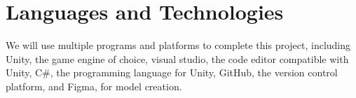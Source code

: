 \documentclass[12pt,oneside,openright,a4paper]{cpe-english-project}
\begin{document}
%


%
%
%

\section{Languages and Technologies}
We will use multiple programs and platforms to complete this project, including Unity, the game engine of choice, visual studio, the code editor compatible with Unity, C\#, the programming language for Unity, GitHub, the version control platform, and Figma, for model creation.
\end{document}
